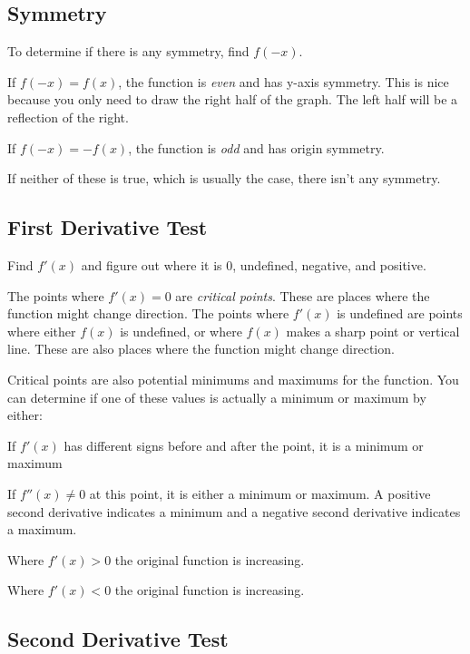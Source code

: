 \documentclass[fleqn]{article}
\begin{document}
\subsection{Symmetry}

To determine if there is any symmetry, find $f(-x)$.  

If $f(-x) = f(x)$, the function is {\em even} and has y-axis symmetry.  This is nice because you only need to draw the right
half of the graph.  The left half will be a reflection of the right.

If $f(-x) = -f(x)$, the function is {\em odd} and has origin symmetry.

If neither of these is true, which is usually the case, there isn't any symmetry.

\subsection{First Derivative Test}
\label{first-derivative-test}

Find $f'(x)$ and figure out where it is 0, undefined, negative, and positive.  

The points where $f'(x) = 0$ are {\em critical points}.  These are places where the function might change direction.
The points where $f'(x)$ is undefined are points where either $f(x)$ is undefined, or where $f(x)$ makes a sharp point
or vertical line.  These are also places where the function might change direction.

Critical points are also potential minimums and maximums for the function.  You can determine if one of these values is
actually a minimum or maximum by either:

\begin{itemize*}
  \item If $f'(x)$ has different signs before and after the point, it is a minimum or maximum
  \item If $f''(x) \neq 0$ at this point, it is either a minimum or maximum.  A positive second derivative indicates a
    minimum and a negative second derivative indicates a maximum.
\end{itemize*}

Where $f'(x) > 0$ the original function is increasing.

Where $f'(x) < 0$ the original function is increasing.

\subsection{Second Derivative Test}
\end{document}
